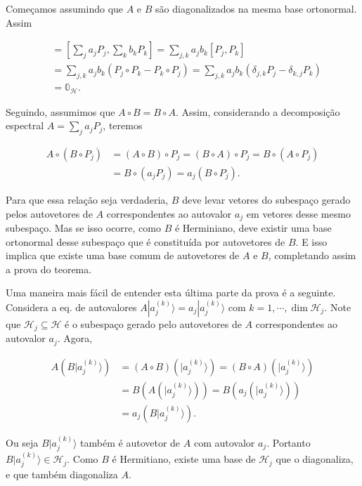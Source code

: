 \documentclass[11pt]{article}
\begin{document}
Começamos assumindo que \(A\) e \(B\) são diagonalizados na mesma base
ortonormal. Assim

\begin{align}
[A,B] & = [\sum_{j}a_{j}P_{j},\sum_{k}b_{k}P_{k}] = \sum_{j,k}a_{j}b_{k}[P_{j},P_{k}] \\
& = \sum_{j,k}a_{j}b_{k}(P_{j}\circ P_{k} -P_{k}\circ P_{j}) = \sum_{j,k}a_{j}b_{k}(\delta_{j,k}P_{j} - \delta_{k,j}P_{k}) \\
& = \mathbb{0}_{\mathcal{H}}.
\end{align}

Seguindo, assumimos que \(A\circ B=B\circ A\). Assim, considerando a
decomposição espectral \(A=\sum_{j}a_{j}P_{j}\), teremos

\begin{align}
A\circ(B\circ P_{j}) & = (A\circ B)\circ P_{j} = (B\circ A)\circ P_{j} = B\circ (A\circ P_{j}) \\ 
& = B\circ (a_{j}P_{j}) = a_{j}(B\circ P_{j}).
\end{align}

Para que essa relação seja verdaderia, \(B\) deve levar vetores do
subespaço gerado pelos autovetores de \(A\) correspondentes ao autovalor
\(a_{j}\) em vetores desse mesmo subespaço. Mas se isso ocorre, como
\(B\) é Herminiano, deve existir uma base ortonormal desse subespaço que
é constituída por autovetores de \(B\). E isso implica que existe uma
base comum de autovetores de \(A\) e \(B\), completando assim a prova do
teorema.

Uma maneira mais fácil de entender esta última parte da prova é a
seguinte. Considera a eq. de autovalores
\(A|a_{j}^{(k)}\rangle=a_{j}|a_{j}^{(k)}\rangle\) com
\(k=1,\cdots,\dim\mathcal{H}_{j}\). Note que
\(\mathcal{H}_{j}\subseteq\mathcal{H}\) é o subespaço gerado pelo
autovetores de \(A\) correspondentes ao autovalor \(a_{j}\). Agora,

\begin{align}
A(B|a_{j}^{(k)}\rangle) & = (A\circ B)(|a_{j}^{(k)}\rangle) = (B\circ A)(|a_{j}^{(k)}\rangle) \\
& =B(A(|a_{j}^{(k)}\rangle)) = B(a_{j}(|a_{j}^{(k)}\rangle)) \\
& = a_{j}(B|a_{j}^{(k)}\rangle).
\end{align}

Ou seja \(B|a_{j}^{(k)}\rangle\) também é autovetor de \(A\) com
autovalor \(a_{j}\). Portanto
\(B|a_{j}^{(k)}\rangle\in \mathcal{H}_{j}\). Como \(B\) é Hermitiano,
existe uma base de \(\mathcal{H}_{j}\) que o diagonaliza, e que também
diagonaliza \(A\).
\end{document}
